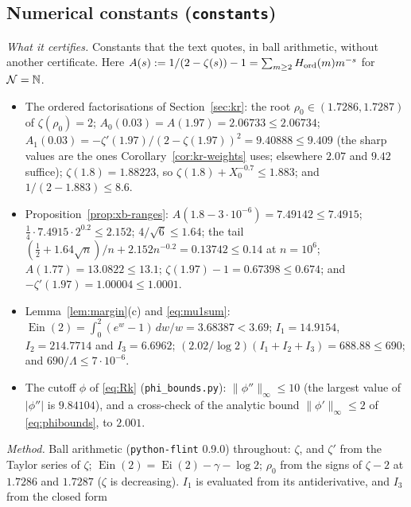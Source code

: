 \subsection{Numerical constants (\texttt{constants})}\label{app:cert-consts}
\emph{What it certifies.} Constants that the text quotes, in ball arithmetic, without another certificate. Here
$A(s):=1/(2-\zeta(s))-1=\sum_{m\ge2}H_{\mathrm{ord}}(m)m^{-s}$ for $\mathcal{N}=\mathbb{N}$.
\begin{itemize}
\item The ordered factorisations of Section~\ref{sec:kr}: the root $\rho_0\in(1.7286,1.7287)$ of $\zeta(\rho_0)=2$;
$A_0(0.03)=A(1.97)=2.06733\le2.06734$; $A_1(0.03)=-\zeta'(1.97)/(2-\zeta(1.97))^2=9.40888\le9.409$ (the sharp values are
the ones Corollary~\ref{cor:kr-weights} uses; elsewhere $2.07$ and $9.42$ suffice); $\zeta(1.8)=1.88223$, so
$\zeta(1.8)+X_0^{-0.7}\le1.883$; and $1/(2-1.883)\le8.6$.
\item Proposition~\ref{prop:xb-ranges}: $A(1.8-3\cdot10^{-6})=7.49142\le7.4915$; $\frac14\cdot7.4915\cdot2^{0.2}\le2.152$;
$4/\sqrt6\le1.64$; the tail $(\frac12+1.64\sqrt n)/n+2.152n^{-0.2}=0.13742\le0.14$ at $n=10^6$; $A(1.77)=13.0822\le13.1$;
$\zeta(1.97)-1=0.67398\le0.674$; and $-\zeta'(1.97)=1.00004\le1.0001$.
\item Lemma~\ref{lem:margin}(c) and \eqref{eq:mu1sum}: $\operatorname{Ein}(2)=\int_0^2(e^w-1)\,dw/w=3.68387<3.69$;
$I_1=14.9154$, $I_2=214.7714$ and $I_3=6.6962$; $(2.02/\log2)(I_1+I_2+I_3)=688.88\le690$; and $690/\Lambda\le7\cdot10^{-6}$.
\item The cutoff $\phi$ of \eqref{eq:Rk} (\texttt{phi\_bounds.py}): $\|\phi''\|_\infty\le10$ (the largest value of $|\phi''|$ is
$9.84104$), and a cross-check of the analytic bound $\|\phi'\|_\infty\le2$ of \eqref{eq:phibounds}, to $2.001$.
\end{itemize}
\emph{Method.} Ball arithmetic (\texttt{python-flint} 0.9.0) throughout: $\zeta$, and $\zeta'$ from the Taylor series of $\zeta$;
$\operatorname{Ein}(2)=\operatorname{Ei}(2)-\gamma-\log2$; $\rho_0$ from the signs of $\zeta-2$ at $1.7286$ and $1.7287$
($\zeta$ is decreasing). $I_1$ is evaluated from its antiderivative, and $I_3$ from the closed form
